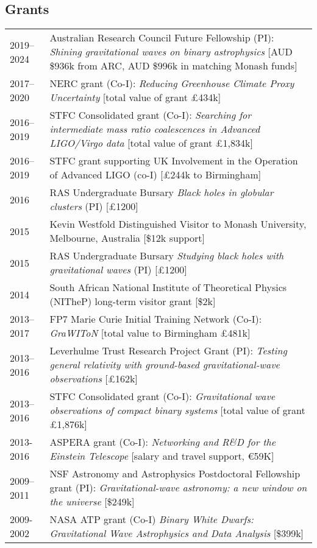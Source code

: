 \documentclass[margin,line]{res}
\begin{document}
\begin{resume}
\section{\sc Grants}
\begin{tabular}{@{}p{0.8in}p{4.7in}}
2019--2024 & Australian Research Council Future Fellowship (PI): {\it  Shining gravitational waves on binary astrophysics} [AUD \$936k from ARC, AUD \$996k in matching Monash funds]\\
2017--2020 & NERC grant (Co-I): {\it Reducing Greenhouse Climate Proxy Uncertainty} [total value of grant \pounds 434k]\\
2016--2019 & STFC Consolidated grant (Co-I): {\it Searching for intermediate mass ratio coalescences in Advanced LIGO/Virgo data} [total value of grant \pounds1,834k]\\
2016--2019 & STFC grant supporting UK Involvement in the Operation of Advanced LIGO (co-I) [\pounds 244k to Birmingham]\\
2016 & RAS Undergraduate Bursary {\it Black holes in globular clusters} (PI) [\pounds 1200]\\
2015 & Kevin Westfold Distinguished Visitor to Monash University, Melbourne, Australia [\$12k support]\\
2015 & RAS Undergraduate Bursary {\it Studying black holes with gravitational waves} (PI) [\pounds 1200]\\
2014 & South African National Institute of Theoretical Physics (NITheP) long-term visitor grant [\$2k]\\
2013--2017 & FP7 Marie Curie Initial Training Network (Co-I): {\it GraWIToN} [total value to Birmingham \pounds 481k]\\
2013--2016 & Leverhulme Trust Research Project Grant (PI): {\it Testing general relativity with ground-based gravitational-wave observations} [\pounds162k]\\
2013--2016 & STFC Consolidated grant (Co-I): {\it Gravitational wave observations of compact binary systems} [total value of grant \pounds1,876k]\\
2013-2016 & ASPERA grant (Co-I): {\it Networking and R\&D for the Einstein Telescope} [salary and travel support, \euro59K]\\
2009--2011 & NSF Astronomy and Astrophysics Postdoctoral Fellowship grant (PI):  {\it Gravitational-wave astronomy: a new window on the universe} [\$249k]\\
2009-2002 & NASA ATP grant (Co-I) {\it Binary White Dwarfs: Gravitational Wave Astrophysics and Data Analysis} [\$399k]\\

\end{tabular}
\end{resume}
\end{document}
